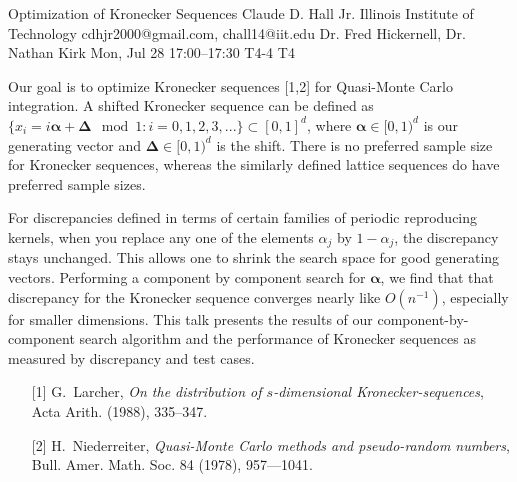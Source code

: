 \begin{talk}
  {Optimization of Kronecker Sequences}%
  {Claude D. Hall Jr.}%
  {Illinois Institute of Technology}%
  {cdhjr2000@gmail.com, chall14@iit.edu}%
  {Dr. Fred Hickernell, Dr. Nathan Kirk}%
  {}%
  {Mon, Jul 28 17:00–17:30}%
  {T4-4}%
  {T4}%
  
				

Our goal is to optimize Kronecker sequences [1,2] for Quasi-Monte Carlo integration. A shifted Kronecker sequence can be defined as $\{ x_i = i \boldsymbol{\alpha} + \boldsymbol{\Delta} \mod 1: i = 0, 1, 2, 3, ... \} \subset [0,1]^d $, where  $\boldsymbol{\alpha} \in [0,1)^d$ is our generating vector and $\boldsymbol{\Delta} \in [0,1)^d$ is the shift. There is no preferred sample size for Kronecker sequences, whereas the similarly defined lattice sequences do have preferred sample sizes. 

For discrepancies defined in terms of certain families of periodic reproducing kernels, when you replace any one of the elements $\alpha_j$ by $1 - \alpha_j$, the discrepancy stays unchanged. This allows one to shrink the search space for good generating vectors.  Performing a component by component search for $\boldsymbol{\alpha}$, we find that that discrepancy for the Kronecker sequence converges nearly like $O(n^{-1})$, especially for smaller dimensions.  This talk presents the results of our component-by-component search algorithm and the performance of Kronecker sequences as measured by discrepancy and test cases.

\medskip

\begin{enumerate}
	\item[{[1]}] G.~Larcher, \emph{On the distribution of $s$-dimensional {K}ronecker-sequences}, Acta Arith. (1988), 335--347.
	\item[{[2]}] H.~Niederreiter, \emph{Quasi-Monte Carlo methods and pseudo-random numbers}, Bull. Amer. Math. Soc. 84 (1978), 957---1041.
\end{enumerate}
\end{talk}

